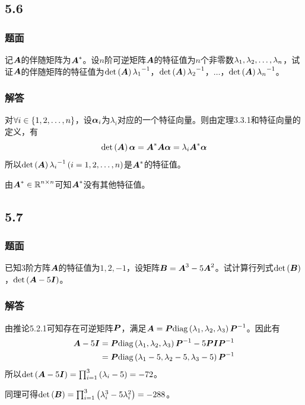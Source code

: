 \documentclass{beamer}
\begin{document}
\subsection*{5.6}
\begin{frame}
    \frametitle{题面}
    记\(\mata\)的伴随矩阵为\(\mata^*\)。设\(n\)阶可逆矩阵\(\mata\)的特征值为\(n\)个非零数\(\enums{\lambda}{n}\)，试证\(\mata\)的伴随矩阵的特征值为\(\det{\mata}\inv{\lambda_1}\)，\(\det{\mata}\inv{\lambda_2}\)，\(\dots\)，\(\det{\mata}\inv{\lambda_n}\)。
\end{frame}

\begin{frame}
    \frametitle{解答}
    对\(\forall i\in\setof{1,2,\dots,n}\)，设\(\vecal_i\)为\(\lambda_i\)对应的一个特征向量。则由定理3.3.1和特征向量的定义，有
    \begin{equation*}
        \det{\mata}\vecal=\mata^*\mata\vecal=\lambda_i\mata^*\vecal
    \end{equation*}
    \pause
    所以\(\det{\mata}\inv{\lambda_i}\mypar{i=1,2,\dots,n}\)是\(\mata^*\)的特征值。

    由\(\mata^*\in\rea^{n\times n}\)可知\(\mata^*\)没有其他特征值。
\end{frame}

\subsection*{5.7}
\begin{frame}
    \frametitle{题面}
    已知\(3\)阶方阵\(\mata\)的特征值为\(1,2,-1\)，设矩阵\(\matb=\mata^3-5\mata^2\)。试计算行列式\(\det{\matb}\)，\(\det{\mata-5\mati}\)。
\end{frame}

\begin{frame}
    \frametitle{解答}

    由推论5.2.1可知存在可逆矩阵\(\matp\)，满足\(\mata=\matp\diag{\lambda_1,\lambda_2,\lambda_3}\inv{\matp}\)。因此有
    \begin{align*}
        \mata-5\mati & =\matp\diag{\lambda_1,\lambda_2,\lambda_3}\inv{\matp}-5\matp\mati\inv{\matp} \\
                     & =\matp\diag{\lambda_1-5,\lambda_2-5,\lambda_3-5}\inv{\matp}
    \end{align*}
    \pause
    所以\(\det{\mata-5\mati}=\prod_{i=1}^3\mypar{\lambda_i-5}=-72\)。

    同理可得\(\det{\matb}=\prod_{i=1}^3\mypar{\lambda_i^3-5\lambda_i^2}=-288\)。

\end{frame}
\end{document}
